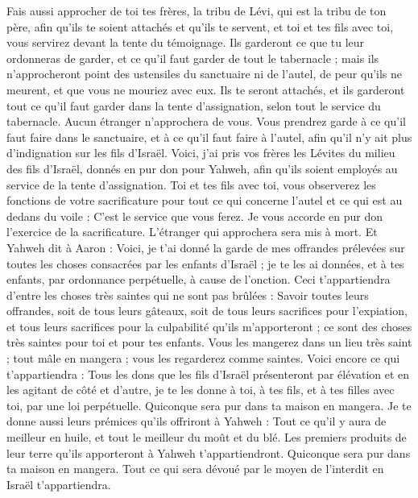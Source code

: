 \begin{multicols}{2}
Fais aussi approcher de toi tes frères, la tribu de Lévi, qui est la tribu de ton père, afin qu'ils te soient attachés et qu'ils te servent, et toi et tes fils avec toi, vous servirez devant la tente du témoignage.
Ils garderont ce que tu leur ordonneras de garder, et ce qu'il faut garder de tout le tabernacle ; mais ils n'approcheront point des ustensiles du sanctuaire ni de l'autel, de peur qu'ils ne meurent, et que vous ne mouriez avec eux.
Ils te seront attachés, et ils garderont tout ce qu'il faut garder dans la tente d'assignation, selon tout le service du tabernacle. Aucun étranger n'approchera de vous.
Vous prendrez garde à ce qu'il faut faire dans le sanctuaire, et à ce qu'il faut faire à l'autel, afin qu'il n'y ait plus d'indignation sur les fils d'Israël.
Voici, j'ai pris vos frères les Lévites du milieu des fils d'Israël, donnés en pur don pour Yahweh, afin qu'ils soient employés au service de la tente d'assignation.
Toi et tes fils avec toi, vous observerez les fonctions de votre sacrificature pour tout ce qui concerne l'autel et ce qui est au dedans du voile : C'est le service que vous ferez. Je vous accorde en pur don l'exercice de la sacrificature. L'étranger qui approchera sera mis à mort.
Et Yahweh dit à Aaron : Voici, je t'ai donné la garde de mes offrandes prélevées sur toutes les choses consacrées par les enfants d'Israël ; je te les ai données, et à tes enfants, par ordonnance perpétuelle, à cause de l'onction.
Ceci t'appartiendra d'entre les choses très saintes qui ne sont pas brûlées : Savoir toutes leurs offrandes, soit de tous leurs gâteaux, soit de tous leurs sacrifices pour l'expiation, et tous leurs sacrifices pour la culpabilité qu'ils m'apporteront ; ce sont des choses très saintes pour toi et pour tes enfants.
Vous les mangerez dans un lieu très saint ; tout mâle en mangera ; vous les regarderez comme saintes.
Voici encore ce qui t'appartiendra : Tous les dons que les fils d'Israël présenteront par élévation et en les agitant de côté et d'autre, je te les donne à toi, à tes fils, et à tes filles avec toi, par une loi perpétuelle. Quiconque sera pur dans ta maison en mangera.
Je te donne aussi leurs prémices qu'ils offriront à Yahweh : Tout ce qu'il y aura de meilleur en huile, et tout le meilleur du moût et du blé.
Les premiers produits de leur terre qu'ils apporteront à Yahweh t'appartiendront. Quiconque sera pur dans ta maison en mangera.
Tout ce qui sera dévoué par le moyen de l'interdit en Israël t'appartiendra.

\end{multicols}
